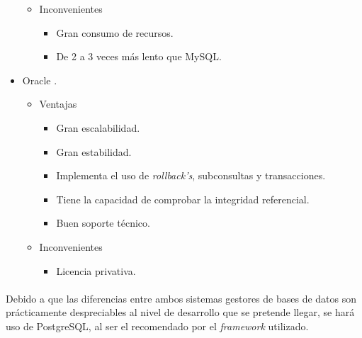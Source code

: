 \begin{itemize}
\begin{itemize}
         \item Inconvenientes
            \begin{itemize}
             \item Gran consumo de recursos.
             \item De 2 a 3 veces más lento que MySQL.
            \end{itemize}
      \end{itemize}
      \item Oracle \cite{oracle}.
      \begin{itemize}
         \item Ventajas
            \begin{itemize}
             \item Gran escalabilidad.
             \item Gran estabilidad.
             \item Implementa el uso de \textit{rollback's}, subconsultas y
                   transacciones.
             \item Tiene la capacidad de comprobar la integridad referencial.
             \item Buen soporte técnico.
            \end{itemize}
         \item Inconvenientes
            \begin{itemize}
             \item Licencia privativa.
            \end{itemize}
      \end{itemize}
   \end{itemize}

   \paragraph{}Debido a que las diferencias entre ambos sistemas gestores de
   bases de datos son prácticamente despreciables al nivel de desarrollo que
   se pretende llegar, se hará uso de PostgreSQL, al ser el recomendado por el
   \textit{framework} utilizado.